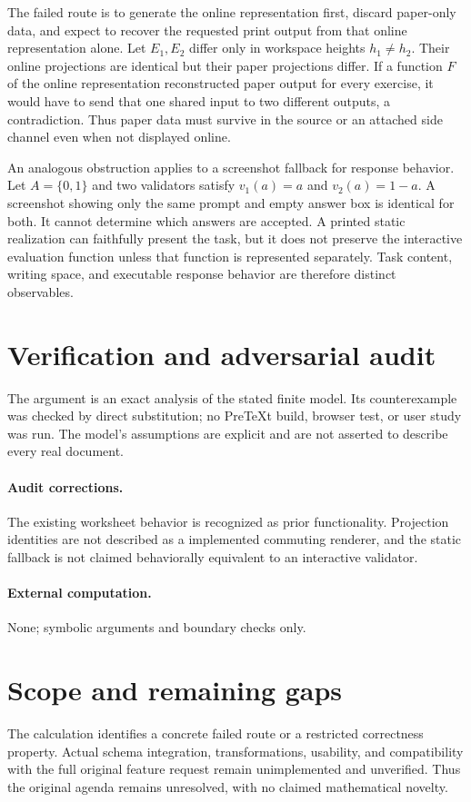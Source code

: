 \documentclass[11pt]{article}
\begin{document}
The failed route is to generate the online representation first, discard paper-only data, and expect to recover the requested print output from that online representation alone. Let $E_1,E_2$ differ only in workspace heights $h_1\ne h_2$. Their online projections are identical but their paper projections differ. If a function $F$ of the online representation reconstructed paper output for every exercise, it would have to send that one shared input to two different outputs, a contradiction. Thus paper data must survive in the source or an attached side channel even when not displayed online.

An analogous obstruction applies to a screenshot fallback for response behavior. Let $A=\{0,1\}$ and two validators satisfy $v_1(a)=a$ and $v_2(a)=1-a$. A screenshot showing only the same prompt and empty answer box is identical for both. It cannot determine which answers are accepted. A printed static realization can faithfully present the task, but it does not preserve the interactive evaluation function unless that function is represented separately. Task content, writing space, and executable response behavior are therefore distinct observables.
\section{Verification and adversarial audit}
The argument is an exact analysis of the stated finite model. Its counterexample was checked by direct substitution; no PreTeXt build, browser test, or user study was run. The model's assumptions are explicit and are not asserted to describe every real document.
\paragraph{Audit corrections.} The existing worksheet behavior is recognized as prior functionality. Projection identities are not described as a implemented commuting renderer, and the static fallback is not claimed behaviorally equivalent to an interactive validator.
\paragraph{External computation.} None; symbolic arguments and boundary checks only.
\section{Scope and remaining gaps}
The calculation identifies a concrete failed route or a restricted correctness property. Actual schema integration, transformations, usability, and compatibility with the full original feature request remain unimplemented and unverified. Thus the original agenda remains unresolved, with no claimed mathematical novelty.
\end{document}
